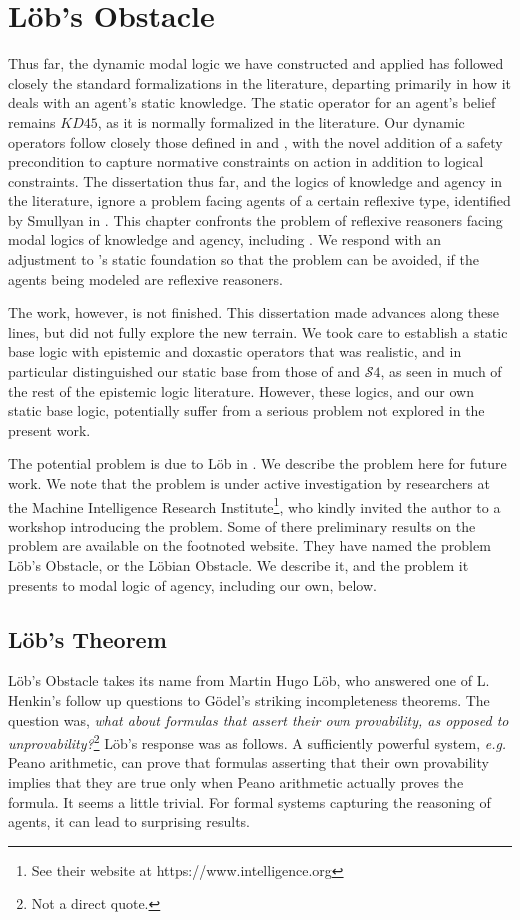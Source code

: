 \chapter{L\"ob's Obstacle}
	\label{CH_05}

Thus far, the dynamic modal logic we have constructed and applied has followed closely the standard formalizations in the literature, departing primarily in how it deals with an agent's static knowledge. The static operator for an agent's belief remains $\mathit{KD}45$, as it is normally formalized in the literature. Our dynamic operators follow closely those defined in \cite{DEL} and \cite{PAL}, with the novel addition of a safety precondition to capture normative constraints on action in addition to logical constraints. The dissertation thus far, and the logics of knowledge and agency in the literature, ignore a problem facing agents of a certain reflexive type, identified by Smullyan in \cite{smullyan}. This chapter confronts the problem of reflexive reasoners facing modal logics of knowledge and agency, including \DASL. We respond with an adjustment to \DASL's static foundation so that the problem can be avoided, if the agents being modeled are reflexive reasoners.

The work, however, is not finished. This dissertation made advances along these lines, but did not fully explore the new terrain. We took care to establish a static base logic with epistemic and doxastic operators that was realistic, and in particular distinguished our static base from those of \SFive and $\mathcal{S}4$, as seen in much of the rest of the epistemic logic literature. However, these logics, and our own static base logic, potentially suffer from a serious problem not explored in the present work.

The potential problem is due to L\"ob in \cite{Lob}. We describe the problem here for future work. We note that the problem is under active investigation by researchers at the Machine Intelligence Research Institute\footnote{See their website at https://www.intelligence.org}, who kindly invited the author to a workshop introducing the problem. Some of there preliminary results on the problem are available on the footnoted website. They have named the problem L\"ob's Obstacle, or the L\"obian Obstacle. We describe it, and the problem it presents to modal logic of agency, including our own, below.

\section{L\"ob's Theorem}
\label{sec:lob_section}
L\"ob's Obstacle takes its name from Martin Hugo L\"ob, who answered one of L. Henkin's follow up questions to G\"odel's striking incompleteness theorems. The question was, \emph{what about formulas that assert their own provability, as opposed to unprovability?}\footnote{Not a direct quote.} L\"ob's response was as follows. A sufficiently powerful system, \emph{e.g.} Peano arithmetic, can prove that formulas asserting that their own provability implies that they are true only when Peano arithmetic actually proves the formula. It seems a little trivial. For formal systems capturing the reasoning of agents, it can lead to surprising results.

